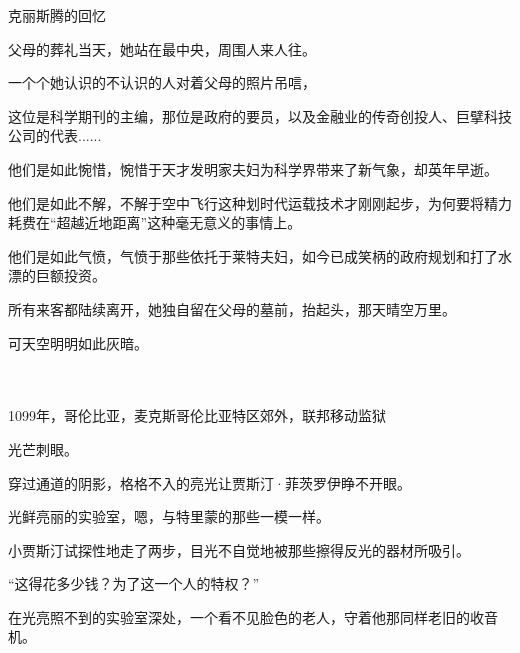 \documentclass[openany]{book}
\begin{document}
{
\begin{center}克丽斯腾的回忆\end{center}\par
父母的葬礼当天，她站在最中央，周围人来人往。\par
一个个她认识的不认识的人对着父母的照片吊唁，\par
这位是科学期刊的主编，那位是政府的要员，以及金融业的传奇创投人、巨擘科技公司的代表......\par
他们是如此惋惜，惋惜于天才发明家夫妇为科学界带来了新气象，却英年早逝。\par
他们是如此不解，不解于空中飞行这种划时代运载技术才刚刚起步，为何要将精力耗费在“超越近地距离”这种毫无意义的事情上。\par
他们是如此气愤，气愤于那些依托于莱特夫妇，如今已成笑柄的政府规划和打了水漂的巨额投资。\par
所有来客都陆续离开，她独自留在父母的墓前，抬起头，那天晴空万里。\par
可天空明明如此灰暗。}
\\
\\
1099年，哥伦比亚，麦克斯哥伦比亚特区郊外，联邦移动监狱\par
光芒刺眼。\par
穿过通道的阴影，格格不入的亮光让贾斯汀·菲茨罗伊睁不开眼。\par
光鲜亮丽的实验室，嗯，与特里蒙的那些一模一样。\par
小贾斯汀试探性地走了两步，目光不自觉地被那些擦得反光的器材所吸引。\par
“这得花多少钱？为了这一个人的特权？”\par
在光亮照不到的实验室深处，一个看不见脸色的老人，守着他那同样老旧的收音机。
\end{document}
